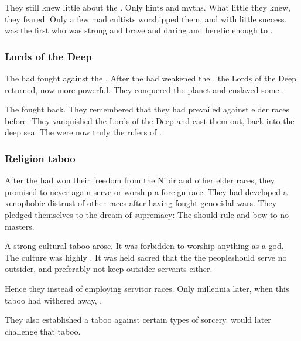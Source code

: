 They still knew little about the \xss. 
Only hints and myths.
What little they knew, they feared.
Only a few mad cultists worshipped them, and with little success.
\Sethicus was the first who was strong and brave and daring and heretic enough to . 





\subsubsection{Lords of the Deep}
The  had fought against the \moonthings. 
After the \ophidians had weakened the \moonthings, the Lords of the Deep returned, now more powerful. 
They conquered the planet and enslaved some \ophidians. 

The \ophidians fought back. 
They remembered that they had prevailed against elder races before. 
They vanquished the Lords of the Deep and cast them out, back into the deep sea. 
The \ophidians were now truly the rulers of \Miith. 





\subsubsection{Religion taboo}
After the \ophidians had won their freedom from the Nibir and other elder races, they promised to never again serve or worship a foreign race. 
They had developed a xenophobic distrust of other races after having fought genocidal wars. 
They pledged themselves to the dream of \ophidian supremacy:
The \ophidians should rule and bow to no masters. 

A strong cultural taboo arose. 
It was forbidden to worship anything as a god. 
The \ophidian culture was highly . 
It was held sacred that the \dash the \caisith people\dash should serve no outsider, and preferably not keep outsider servants either. 

Hence they  instead of employing servitor races. 
Only millennia later, when this taboo had withered away, . 

They also established a taboo against certain types of sorcery. 
\Sethicus would later challenge that taboo. 





